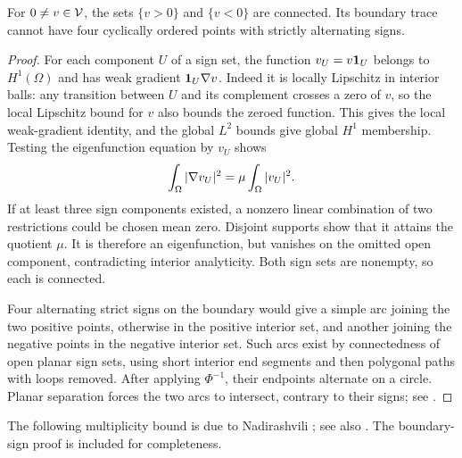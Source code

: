 \begin{lemma}\label{lem:nodal}
For $0\ne v\in\mathcal V$, the sets $\{v>0\}$ and $\{v<0\}$ are connected. Its boundary trace cannot have four cyclically ordered points with strictly alternating signs.
\end{lemma}
\begin{proof}
For each component $U$ of a sign set, the function $v_U=v\mathbf 1_U$ belongs to $H^1(\Omega)$ and has weak gradient $\mathbf 1_U\nabla v$. Indeed it is locally Lipschitz in interior balls: any transition between $U$ and its complement crosses a zero of $v$, so the local Lipschitz bound for $v$ also bounds the zeroed function. This gives the local weak-gradient identity, and the global $L^2$ bounds give global $H^1$ membership. Testing the eigenfunction equation by $v_U$ shows
\[
\int_\Omega|\nabla v_U|^2=\mu\int_\Omega|v_U|^2.
\]
If at least three sign components existed, a nonzero linear combination of two restrictions could be chosen mean zero. Disjoint supports show that it attains the quotient $\mu$. It is therefore an eigenfunction, but vanishes on the omitted open component, contradicting interior analyticity. Both sign sets are nonempty, so each is connected.

Four alternating strict signs on the boundary would give a simple arc joining the two positive points, otherwise in the positive interior set, and another joining the negative points in the negative interior set. Such arcs exist by connectedness of open planar sign sets, using short interior end segments and then polygonal paths with loops removed. After applying $\Phi^{-1}$, their endpoints alternate on a circle. Planar separation forces the two arcs to intersect, contrary to their signs; see .
\end{proof}



The following multiplicity bound is due to Nadirashvili \cite[Theorem~3, p.~227]{Nadirashvili1988}; see also \cite[Proposition~2.5]{BanuelosBurdzy1999}. The boundary-sign proof is included for completeness.

